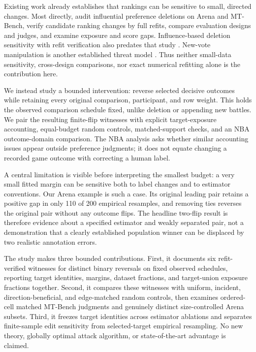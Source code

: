 \documentclass{article}
\begin{document}
Existing work already establishes that rankings can be sensitive to small, directed changes. Most directly, \citet{huang2025dropping} audit influential preference deletions on Arena and MT-Bench, verify candidate ranking changes by full refits, compare evaluation designs and judges, and examine exposure and score gaps. Influence-based deletion sensitivity with refit verification also predates that study \citep{broderick2020automatic}. New-vote manipulation is another established threat model \citep{min2025improving}. Thus neither small-data sensitivity, cross-design comparisons, nor exact numerical refitting alone is the contribution here.

We instead study a bounded intervention: reverse selected decisive outcomes while retaining every original comparison, participant, and row weight. This holds the observed comparison schedule fixed, unlike deletion or appending new battles. We pair the resulting finite-flip witnesses with explicit target-exposure accounting, equal-budget random controls, matched-support checks, and an NBA outcome-domain comparison. The NBA analysis asks whether similar accounting issues appear outside preference judgments; it does not equate changing a recorded game outcome with correcting a human label.

A central limitation is visible before interpreting the smallest budget: a very small fitted margin can be sensitive both to label changes and to estimator conventions. Our Arena example is such a case. Its original leading pair retains a positive gap in only 110 of 200 empirical resamples, and removing ties reverses the original pair without any outcome flips. The headline two-flip result is therefore evidence about a specified estimator and weakly separated pair, not a demonstration that a clearly established population winner can be displaced by two realistic annotation errors.

The study makes three bounded contributions. First, it documents six refit-verified witnesses for distinct binary reversals on fixed observed schedules, reporting target identities, margins, dataset fractions, and target-union exposure fractions together. Second, it compares these witnesses with uniform, incident, direction-beneficial, and edge-matched random controls, then examines ordered-cell matched MT-Bench judgments and genuinely distinct size-controlled Arena subsets. Third, it freezes target identities across estimator ablations and separates finite-sample edit sensitivity from selected-target empirical resampling. No new theory, globally optimal attack algorithm, or state-of-the-art advantage is claimed.
\end{document}
